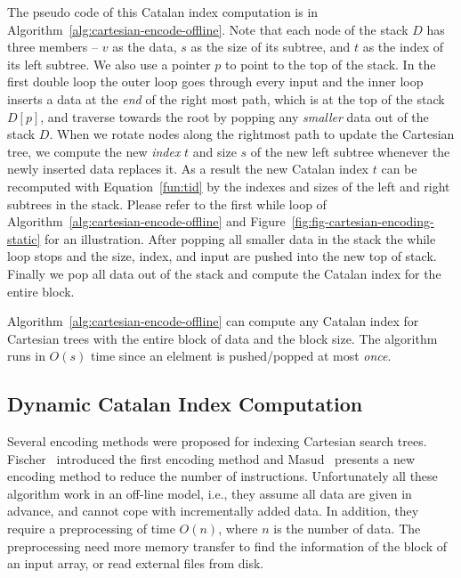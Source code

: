 The pseudo code of this Catalan index computation is in
Algorithm~\ref{alg:cartesian-encode-offline}.  Note that each node of
the stack $D$ has three members -- $v$ as the data, $s$ as the size of
its subtree, and $t$ as the index of its left subtree.  We also use a
pointer $p$ to point to the top of the stack.  In the first double
loop the outer loop goes through every input and the inner loop
inserts a data at the {\em end} of the right most path, which is at
the top of the stack $D[p]$, and traverse towards the root by popping
any {\em smaller} data out of the stack $D$.  When we rotate nodes
along the rightmost path to update the Cartesian tree, we compute the
new {\em index} $t$ and size $s$ of the new left subtree whenever the
newly inserted data replaces it.  As a result the new Catalan index
$t$ can be recomputed with Equation~\ref{fun:tid} by the indexes and
sizes of the left and right subtrees in the stack.  Please refer to
the first while loop of Algorithm~\ref{alg:cartesian-encode-offline}
and Figure~\ref{fig:fig-cartesian-encoding-static} for an
illustration.  After popping all smaller data in the stack the while
loop stops and the size, index, and input are pushed into the new top
of stack.  Finally we pop all data out of the stack and compute the
Catalan index for the entire block.

Algorithm~\ref{alg:cartesian-encode-offline} can compute any Catalan
index for Cartesian trees with the entire block of data and the block
size.  The algorithm runs in $O(s)$ time since an elelment is
pushed/popped at most {\em once}.



\subsection{Dynamic Catalan Index Computation}


Several encoding methods were proposed for indexing Cartesian search
trees.  Fischer~\cite{Fischer2006TheoreticalAP} introduced the first
encoding method and Masud~\cite{Hasan2010CacheOA} presents a new
encoding method to reduce the number of instructions.  Unfortunately
all these algorithm work in an off-line model, i.e., they assume all
data are given in advance, and cannot cope with incrementally added
data.  In addition, they require a preprocessing of time $O(n)$, where
$n$ is the number of data.  The preprocessing need more memory
transfer to find the information of the block of an input array, or
read external files from disk.

